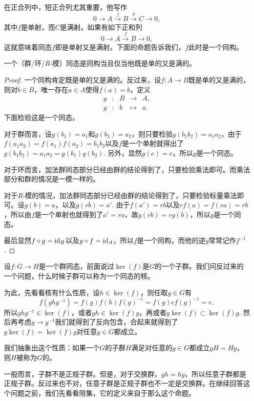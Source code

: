在正合列中，短正合列尤其重要，他写作
\[
	0\to A \xrightarrow{f} B \xrightarrow{g} C\to 0,
\]
其中$f$是单射，而$C$是满射。如果有如下正和列
\[
	0\to A \xrightarrow{f} B \to 0,
\]
这就意味着同态$f$即是单射又是满射。下面的命题告诉我们，$f$此时是一个同构。

\begin{pro}
一个（群/环/$R$-模）同态是同构当且仅当他既是单的又是满的。
\end{pro}

\begin{proof}
一个同构肯定既是单的又是满的。反过来，设$f: A\to B$既是单的又是满的，则对$b\in B$，唯一存在$a\in A$使得$f(a)=b$，定义
\[
	\begin{array}{ccccc}
		g &:&B &\to& A,\\
		g &:&b &\mapsto& a.
	\end{array}
\]
下面检验这是一个同态。

对于群而言，设$g(b_1)=a_1$和$g(b_2)=a_2$，则只要检验$g(b_1b_2)=a_1a_2$，由于$f(a_1a_2)=f(a_1)f(a_2)=b_1b_2$以及$f$是一个单射就得出了$g(b_1b_2)=a_1a_2=g(b_1)g(b_2)$. 另外，显然$g(e)=e$，所以$g$是一个同态。

对于环而言，加法群同态部分已经由群的结论得到了，只要检验乘法即可。而乘法部分和群的情况是一模一样的。

对于$R$-模的情况，加法群同态部分已经由群的结论得到了，只要检验标量乘法即可。设$g(b)=a$，以及$g(rb)=a'$. 由于$f(a')=rb$以及$rf(a)=f(ra)=rb$，所以由$f$是一个单射也就得到了$a'=ra$，故$g(rb)=rg(b)$，所以$g$是一个同态。

最后显然$f\circ g =\operatorname{id}_B$以及$g\circ f=\operatorname{id}_A$，所以$f$是一个同构，而他的逆$g$常常记作$f^{-1}$.
\end{proof}

\para[正规子群] 设$f:G\to H$是一个群同态，前面说过$\ker(f)$是$G$的一个子群。我们问反过来的一个问题，什么时候子群可以称为一个同态的核。

为此，先看看核有什么性质，设$h\in \ker(f)$，则任取$g\in G$有
\[
	f\left(ghg^{-1}\right)=f(g)f(h)f(g)^{-1}=f(g)ef(g)^{-1}=e,
\]
所以$ghg^{-1}\in \ker(f)$，或者$gh \in \ker(f)g$，再或者$g\ker(f)\subset \ker(f)g$. 然后再考虑$g\to g^{-1}$我们就得到了反向包含，合起来就得到了$g\ker(f)=\ker(f)g$对任意$g\in G$都成立。

我们抽象出这个性质：如果一个$G$的子群$H$满足对任意的$g\in G$都成立$gH=Hg$，则$H$被称为$G$的。
\endpara

一般而言，子群不是正规子群。但是，对于交换群，$gh=hg$，所以任意子群都是正规子群。反过来也不对，任意子群是正规子群也不一定是交换群。在继续回答这个问题之前，我们先看看陪集，它的定义来自于那么这个命题。

